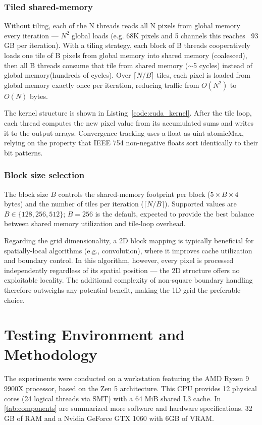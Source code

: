 \documentclass[10pt,twocolumn,letterpaper]{article}
\begin{document}
\subsubsection{Tiled shared-memory}
Without tiling, each of the N threads reads all N pixels from global memory every iteration — $N^2$ global loads (e.g. 68K pixels and 5 channels this reaches ~93 GB per iteration). With a tiling strategy, each block of B threads cooperatively loads one tile of B pixels from global memory into shared memory (coalesced), then all B threads consume that tile from shared memory ($\sim$5 cycles) instead of global memory(hundreds of cycles). Over $\lceil N / B \rceil$ tiles, each pixel is loaded from global memory exactly once per iteration, reducing traffic from $O(N^2)$ to $O(N)$ bytes. 

The kernel structure is shown in Listing~\ref{code:cuda_kernel}. After the tile loop, each thread computes the new pixel value from its accumulated sums and writes it to the output arrays. Convergence tracking uses a float-as-uint atomicMax, relying on the property that IEEE 754 non-negative floats sort identically to their bit patterns.

\subsubsection{Block size selection}
The block size $B$ controls the shared-memory footprint per block ($5 \times B \times 4$ bytes) and the number of tiles per iteration ($\lceil N / B \rceil$). Supported values are $B \in \{128, 256, 512\}$; $B = 256$ is the default, expected to provide the best balance between shared memory utilization and tile-loop overhead.

Regarding the grid dimensionality, a 2D block mapping is typically beneficial for spatially-local algorithms (e.g., convolution), where it improves cache utilization and boundary control. In this algorithm, however, every pixel is processed independently regardless of its spatial position — the 2D structure offers no exploitable locality. The additional complexity of non-square boundary handling therefore outweighs any potential benefit, making the 1D grid the preferable choice.


\section{Testing Environment and Methodology}
The experiments were conducted on a workstation featuring the AMD Ryzen 9 9900X processor, based on the Zen 5 architecture. This CPU provides 12 physical cores (24 logical threads via SMT) with a 64 MiB shared L3 cache. In \cref{tab:components} are summarized more software and hardware specifications. 32 GB of RAM and a Nvidia GeForce GTX 1060 with 6GB of VRAM.
\end{document}
